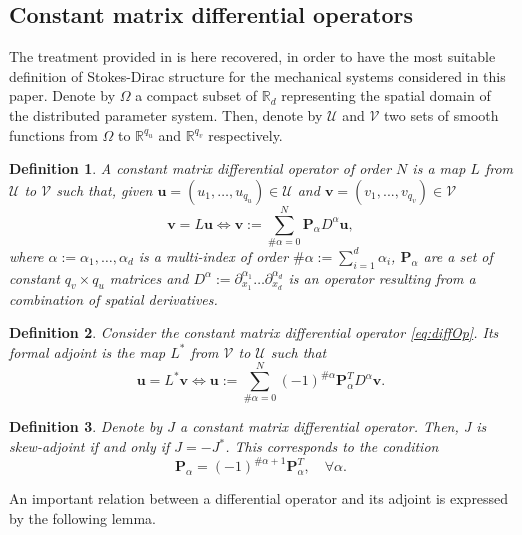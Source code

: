 \documentclass[preprint,12pt]{elsarticle}
\newtheorem{definition}{Definition}
\begin{document}
{\subsection{Constant matrix differential operators}
The treatment provided in \cite{MacchelliModelling} is here recovered, in order to have the most suitable definition of Stokes-Dirac structure for the mechanical systems considered in this paper.
Denote by $\Omega$ a compact subset of $\mathbb{R}_d$ representing the spatial domain of the distributed parameter system. Then, denote by $\mathcal{U}$ and $\mathcal{V}$ two sets of smooth functions from $\Omega$ to $\mathbb{R}^{q_u}$ and $\mathbb{R}^{q_v}$ respectively.
\begin{definition}
A constant matrix differential operator of order $N$ is a map $L$ from $\mathcal{U}$ to $\mathcal{V}$ such that, given $\bm{u} = (u_1 , \dots , u_{q_u}) \in \mathcal{U}$ and $\bm{v} = (v_1 , . . . , v_{q_v}) \in \mathcal{V}$
\begin{equation}
\label{eq:diffOp}
\bm{v} = L \bm{u} \iff \bm{v} := \sum_{\#\alpha=0}^N  \bm{P}_{\alpha} D^{\alpha} \bm{u},
\end{equation}
where $\alpha := {\alpha_1, \dots , \alpha_d }$ is a multi-index of order $\#\alpha := \sum_{i=1}^d \alpha_i$, $\bm{P}_\alpha$ are a set of constant $q_v \times q_u$ matrices and $D^{\alpha} := \partial_{x_1}^{\alpha_1} \dots \partial_{x_d}^{\alpha_d}$ is an operator resulting from a combination of spatial derivatives. 
\end{definition}
\begin{definition}
Consider the constant matrix differential operator \eqref{eq:diffOp}. Its formal adjoint is the map $L^*$ from $\mathcal{V}$ to $\mathcal{U}$ such that
\begin{equation}
\bm{u} = L^* \bm{v} \iff \bm{u} := \sum_{\#\alpha=0}^N  (-1)^{\#\alpha} \bm{P}_{\alpha}^T D^{\alpha} \bm{v}.
\end{equation}
\end{definition}
\begin{definition}
	\label{def:skewOp}
Denote by $J$ a constant matrix differential operator. Then, J is skew-adjoint if and only if $J = -J^*$. This corresponds to the condition
\begin{equation}
\bm{P}_{\alpha} = (-1)^{\#\alpha + 1} \bm{P}_{\alpha}^T, \quad \forall \alpha.
\end{equation}
\end{definition}
An important relation between a differential operator and
its adjoint is expressed by the following lemma.
}
\end{document}
